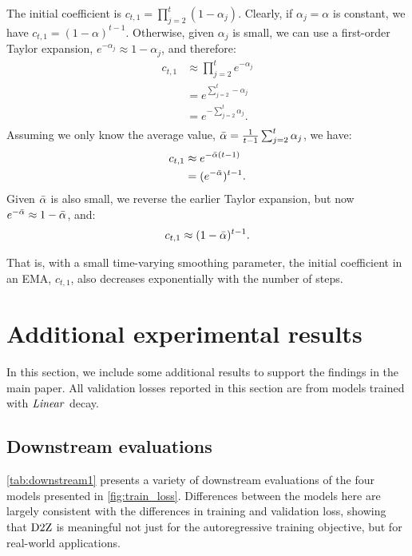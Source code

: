The initial coefficient is $c_{t,1} = \prod_{j=2}^{t} (1 - \alpha_j)$.
Clearly, if $\alpha_j = \alpha$ is constant, we have $c_{t,1} = (1 - \alpha)^{t-1}$.
%
Otherwise, given $\alpha_j$ is small, we can use a first-order Taylor expansion,
$e^{-\alpha_j} \approx 1 - \alpha_j$, and therefore:
\begin{align*}
  c_{t,1} &\approx \prod_{j=2}^{t} e^{-\alpha_j} \\
  &= e^{\sum_{j=2}^{t} -\alpha_j} \\
  &= e^{- \sum_{j=2}^{t} \alpha_j}. \\
\end{align*}
Assuming we only know the average value, $\bar{\alpha} = \frac{1}{t-1} \sum_{j=2}^{t} \alpha_j$,
  we have:
\begin{align*}
  c_{t,1} &\approx e^{-\bar{\alpha}(t-1)} \\
          &= (e^{-\bar{\alpha}})^{t-1}. \\
\end{align*}
Given $\bar{\alpha}$ is also small, we reverse the earlier Taylor
expansion, but now $e^{-\bar{\alpha}} \approx 1 - \bar{\alpha}$, and:
\begin{align*}
  c_{t,1} &\approx (1 - \bar{\alpha})^{t-1}. \\
\end{align*}

That is, with a small time-varying smoothing parameter, the initial
coefficient in an EMA, $c_{t,1}$, also decreases exponentially with
the number of steps.

\section{Additional experimental results}

In this section, we include some additional results to support the
findings in the main paper.  All validation losses reported in this
section are from models trained with $\mbox{\emph{Linear}}$ decay.

\subsection{Downstream evaluations}\label{subsec:downstream}




\cref{tab:downstream1} presents a variety of downstream
evaluations of the four models presented in
\cref{fig:train_loss}.
%
Differences between the models here are largely consistent with the
differences in training and validation loss, showing that $\mbox{D2Z}$ is
meaningful not just for the autoregressive training objective, but for
real-world applications.

